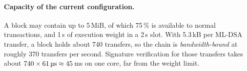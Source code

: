 \paragraph{Capacity of the current configuration.} A block may contain up to 5\,MiB, of which 75\,\%
is available to normal transactions, and 1\,s of execution weight in a 2\,s slot. With 5.3\,kB per
ML-DSA transfer, a block holds about 740 transfers, so the chain is \emph{bandwidth-bound} at roughly
370 transfers per second. Signature verification for those transfers takes about
$740 \times 61\,\text{\textmu s} \approx 45$\,ms on one core, far from the weight limit.
